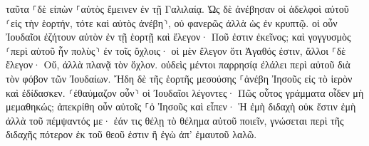 \documentclass{openreader}
\begin{document}
ταῦτα ⸀δὲ εἰπὼν ⸀αὐτὸς ἔμεινεν ἐν τῇ Γαλιλαίᾳ. 
Ὡς δὲ ἀνέβησαν οἱ ἀδελφοὶ αὐτοῦ ⸂εἰς τὴν ἑορτήν, τότε καὶ αὐτὸς ἀνέβη⸃, οὐ φανερῶς ἀλλὰ ὡς ἐν κρυπτῷ. 
οἱ οὖν Ἰουδαῖοι ἐζήτουν αὐτὸν ἐν τῇ ἑορτῇ καὶ ἔλεγον· Ποῦ ἐστιν ἐκεῖνος; 
καὶ γογγυσμὸς ⸂περὶ αὐτοῦ ἦν πολὺς⸃ ἐν τοῖς ὄχλοις· οἱ μὲν ἔλεγον ὅτι Ἀγαθός ἐστιν, ἄλλοι ⸀δὲ ἔλεγον· Οὔ, ἀλλὰ πλανᾷ τὸν ὄχλον. 
οὐδεὶς μέντοι παρρησίᾳ ἐλάλει περὶ αὐτοῦ διὰ τὸν φόβον τῶν Ἰουδαίων. 
Ἤδη δὲ τῆς ἑορτῆς μεσούσης ⸀ἀνέβη Ἰησοῦς εἰς τὸ ἱερὸν καὶ ἐδίδασκεν. 
⸂ἐθαύμαζον οὖν⸃ οἱ Ἰουδαῖοι λέγοντες· Πῶς οὗτος γράμματα οἶδεν μὴ μεμαθηκώς; 
ἀπεκρίθη οὖν αὐτοῖς ⸀ὁ Ἰησοῦς καὶ εἶπεν· Ἡ ἐμὴ διδαχὴ οὐκ ἔστιν ἐμὴ ἀλλὰ τοῦ πέμψαντός με· 
ἐάν τις θέλῃ τὸ θέλημα αὐτοῦ ποιεῖν, γνώσεται περὶ τῆς διδαχῆς πότερον ἐκ τοῦ θεοῦ ἐστιν ἢ ἐγὼ ἀπ’ ἐμαυτοῦ λαλῶ. 
\end{document}
